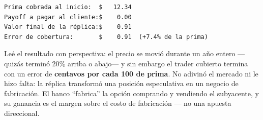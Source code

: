 \documentclass[
  spanish,
  letterpaper,
  DIV=11,
  numbers=noendperiod]{scrreprt}
\newenvironment{Shaded}{\begin{snugshade}}{\end{snugshade}}
\newcommand{\BuiltInTok}[1]{\textcolor[rgb]{0.00,0.23,0.31}{#1}}
\newcommand{\DecValTok}[1]{\textcolor[rgb]{0.68,0.00,0.00}{#1}}
\newcommand{\NormalTok}[1]{\textcolor[rgb]{0.00,0.23,0.31}{#1}}
\newcommand{\OperatorTok}[1]{\textcolor[rgb]{0.37,0.37,0.37}{#1}}
\newcommand{\SpecialCharTok}[1]{\textcolor[rgb]{0.37,0.37,0.37}{#1}}
\newcommand{\SpecialStringTok}[1]{\textcolor[rgb]{0.13,0.47,0.30}{#1}}
\newcommand{\StringTok}[1]{\textcolor[rgb]{0.13,0.47,0.30}{#1}}
\begin{document}
\begin{Shaded}
\end{Shaded}

\begin{verbatim}
Prima cobrada al inicio:  $   12.34
Payoff a pagar al cliente:$    0.00
Valor final de la réplica:$    0.91
Error de cobertura:       $    0.91  (+7.4% de la prima)
\end{verbatim}

Leé el resultado con perspectiva: el precio se movió durante un año
entero ---quizás terminó 20\% arriba o abajo--- y sin embargo el trader
cubierto termina con un error de \textbf{centavos por cada 100 de
prima}. No adivinó el mercado ni le hizo falta: la réplica transformó
una posición especulativa en un negocio de fabricación. El banco
``fabrica'' la opción comprando y vendiendo el subyacente, y su ganancia
es el margen sobre el costo de fabricación --- no una apuesta
direccional.
\end{document}

